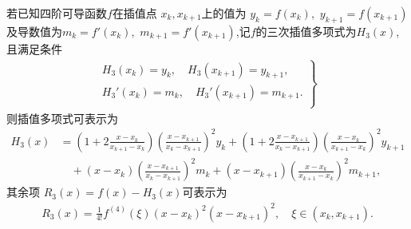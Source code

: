 \documentclass[../../main.tex]{subfiles}
\begin{document}
\begin{theorem}[两点三次插值多项式]
若已知四阶可导函数${\textstyle f}$在插值点 ${\textstyle x_k,x_{k+1}}$上的值为 ${\textstyle y_k=f(x_k),\,\, y_{k+1}=f(x_{k+1})}$及导数值为${\textstyle m_k=f'(x_k),\,\, m_{k+1}=f'(x_{k+1})}$,记$f$的三次插值多项式为$H_3(x)$,且满足条件
\begin{align}
\left. \begin{array}{r}
H_3(x_k)=y_k,\quad H_3(x_{k+1})=y_{k+1},\\
H_3'(x_k)=m_k,\quad H_3' (x_{k+1})=m_{k+1}.\\
\end{array} \right\} \label{eq:数值分析-4.6}
\end{align}
则插值多项式可表示为
\begin{align}
H_3(x) &= \left( 1 + 2 \frac{x - x_k}{x_{k+1} - x_k} \right) \left( \frac{x - x_{k+1}}{x_k - x_{k+1}} \right)^2 y_k + \left( 1 + 2 \frac{x - x_{k+1}}{x_k - x_{k+1}} \right) \left( \frac{x - x_k}{x_{k+1} - x_k} \right)^2 y_{k+1} \nonumber \\
&\quad + (x - x_k) \left( \frac{x - x_{k+1}}{x_k - x_{k+1}} \right)^2 m_k + (x - x_{k+1}) \left( \frac{x - x_k}{x_{k+1} - x_k} \right)^2 m_{k+1}, \label{eq:数值分析-4.12}
\end{align}
其余项 $R_3(x) = f(x) - H_3(x)$可表示为
\begin{align}
R_3(x) = \frac{1}{4!} f^{(4)}(\xi) (x - x_k)^2 (x - x_{k+1})^2, \quad \xi \in (x_k, x_{k+1}). \label{eq:数值分析-4.13}
\end{align}
\end{theorem}
\end{document}
